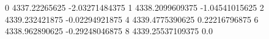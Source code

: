 0 4337.22265625 -2.03271484375
1 4338.2099609375 -1.04541015625
2 4339.232421875 -0.02294921875
4 4339.4775390625 0.22216796875
6 4338.962890625 -0.29248046875
8 4339.25537109375 0.0
